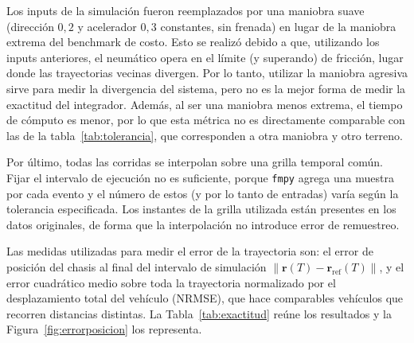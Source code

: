 Los inputs de la simulación fueron reemplazados por una maniobra suave (dirección $0{,}2$ y acelerador $0{,}3$ constantes, sin frenada) en lugar de la maniobra extrema del benchmark de costo. Esto se realizó debido a que, utilizando los inputs anteriores, el neumático opera en el límite (y superando) de fricción, lugar donde las trayectorias vecinas divergen. Por lo tanto, utilizar la maniobra agresiva sirve para medir la divergencia del sistema, pero no es la mejor forma de medir la exactitud del integrador. Además, al ser una maniobra menos extrema, el tiempo de cómputo es menor, por lo que esta métrica no es directamente comparable con las de la tabla~\ref{tab:tolerancia}, que corresponden a otra maniobra y otro terreno.

Por último, todas las corridas se interpolan sobre una grilla temporal común. Fijar el intervalo de ejecución no es suficiente, porque \verb|fmpy| agrega una muestra por cada evento y el número de estos (y por lo tanto de entradas) varía según la tolerancia especificada. Los instantes de la grilla utilizada están presentes en los datos originales, de forma que la interpolación no introduce error de remuestreo.

Las medidas utilizadas para medir el error de la trayectoria son: el error de posición del chasis al final del intervalo de simulación $\lVert \mathbf{r}(T) - \mathbf{r}_\text{ref}(T) \rVert$, y el error cuadrático medio sobre toda la trayectoria normalizado por el desplazamiento total del vehículo (NRMSE), que hace comparables vehículos que recorren distancias distintas. La Tabla~\ref{tab:exactitud} reúne los resultados y la Figura~\ref{fig:errorposicion} los representa.

